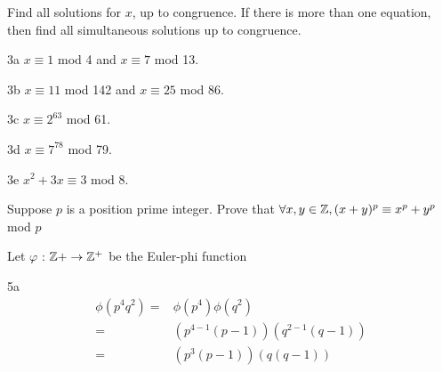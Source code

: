 
\begin{question}{3}
Find all solutions for $x$, up to congruence. If there is more than one equation, then find all simultaneous solutions up to congruence.
\end{question}


\begin{question}{3a}
$x \equiv 1$ mod 4 and $x \equiv 7$ mod 13.
\end{question}

\begin{question}{3b}
$x \equiv 11$ mod 142 and $x \equiv 25$ mod 86.
\end{question}

\begin{question}{3c}
$x \equiv 2^{63}$ mod 61.
\end{question}

\begin{question}{3d}
$x \equiv 7^{78}$ mod 79.
\end{question}

\begin{question}{3e}
$x^2 + 3x \equiv 3$ mod 8.
\end{question}


\begin{question}{4}
Suppose $p$ is a position prime integer. Prove that $\forall x,y \in \mathbb{Z}, (x+y)^p \equiv x^p + y^p$ mod $p$
\end{question}


\begin{question}{5}
Let $\varphi$ : $\mathbb{Z}+ \rightarrow \mathbb{Z}^+$ be the Euler-phi function
\end{question}


\begin{question}{5a}
\begin{align*}
\phi(p^4q^2) =& \phi(p^4)\phi(q^2)\\
=& (p^{4-1}(p-1))(q^{2-1}(q-1))\\
=& (p^{3}(p-1))(q(q-1))
\end{align*}
\end{question}

